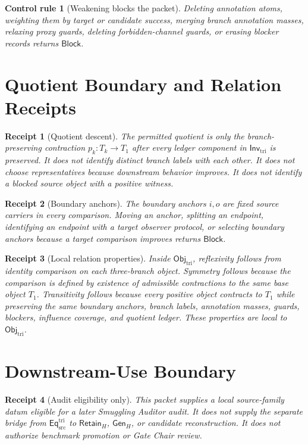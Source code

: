 \documentclass[11pt]{article}
\newcommand{\EqTri}{\mathsf{Eq}_{\mathrm{src}}^{\mathrm{tri}}}
\newcommand{\ObjTri}{\mathsf{Obj}_{\mathrm{tri}}}
\newcommand{\InvTri}{\mathsf{Inv}_{\mathrm{tri}}}
\newcommand{\RetainH}{\mathsf{Retain}_{H}}
\newcommand{\GenH}{\mathsf{Gen}_{H}}
\newcommand{\Block}{\mathsf{Block}}
\newtheorem{receipt}{Receipt}
\newtheorem{controlrule}{Control rule}
\begin{document}
\begin{controlrule}[Weakening blocks the packet]
Deleting annotation atoms, weighting them by target or candidate success,
merging branch annotation masses, relaxing proxy guards, deleting
forbidden-channel guards, or erasing blocker records returns \(\Block\).
\end{controlrule}

\section{Quotient Boundary and Relation Receipts}

\begin{receipt}[Quotient descent]
The permitted quotient is only the branch-preserving contraction
\(p_{k}:T_{k}\to T_{1}\) after every ledger component in \(\InvTri\) is
preserved. It does not identify distinct branch labels with each other.
It does not choose representatives because downstream behavior improves.
It does not identify a blocked source object with a positive witness.
\end{receipt}

\begin{receipt}[Boundary anchors]
The boundary anchors \(i,o\) are fixed source carriers in every
comparison. Moving an anchor, splitting an endpoint, identifying an
endpoint with a target observer protocol, or selecting boundary anchors
because a target comparison improves returns \(\Block\).
\end{receipt}

\begin{receipt}[Local relation properties]
Inside \(\ObjTri\), reflexivity follows from identity comparison on each
three-branch object. Symmetry follows because the comparison is defined
by existence of admissible contractions to the same base object
\(T_{1}\). Transitivity follows because every positive object contracts
to \(T_{1}\) while preserving the same boundary anchors, branch labels,
annotation masses, guards, blockers, influence coverage, and quotient
ledger. These properties are local to \(\ObjTri\).
\end{receipt}

\section{Downstream-Use Boundary}

\begin{receipt}[Audit eligibility only]
This packet supplies a local source-family datum eligible for a later
Smuggling Auditor audit. It does not supply the separate bridge from
\(\EqTri\) to \(\RetainH\), \(\GenH\), or candidate reconstruction. It
does not authorize benchmark promotion or Gate Chair review.
\end{receipt}
\end{document}
